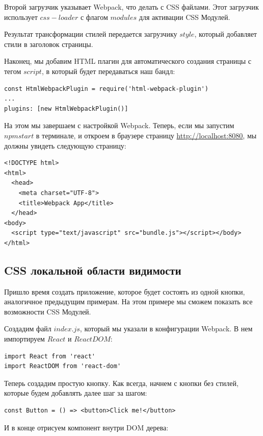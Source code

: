  Второй загрузчик указывает Webpack, что делать с CSS файлами. Этот загрузчик использует $css-loader$ с флагом $modules$ для активации CSS Модулей.
 
 Результат трансформации стилей передается загрузчику $style$, который добавляет стили в заголовок страницы.
 
 Наконец, мы добавим HTML плагин для автоматического создания страницы с тегом $script$, в который будет передаваться наш бандл:
 
\begin{lstlisting}
const HtmlWebpackPlugin = require('html-webpack-plugin')
...
plugins: [new HtmlWebpackPlugin()]
\end{lstlisting}

На этом мы завершаем с настройкой Webpack. Теперь, если мы запустим $npm start$ в терминале, и откроем в браузере страницу \url{http://localhost:8080}, мы должны увидеть следующую страницу:

\begin{lstlisting}
<!DOCTYPE html>
<html>
  <head>
    <meta charset="UTF-8">
    <title>Webpack App</title>
  </head>
<body>
  <script type="text/javascript" src="bundle.js"></script></body>
</html>
\end{lstlisting}
 
\subsection{CSS локальной области видимости}

Пришло время создать приложение, которое будет состоять из одной кнопки, аналогичное предыдущим примерам. На этом примере мы сможем показать все возможности CSS Модулей.

Создадим файл $index.js$, который мы указали в конфигурации Webpack. В нем импортируем $React$ и $ReactDOM$:

\begin{lstlisting}
import React from 'react'
import ReactDOM from 'react-dom'
\end{lstlisting}

Теперь создадим простую кнопку. Как всегда, начнем с кнопки без стилей, которые будем добавлять далее шаг за шагом:

\begin{lstlisting}
const Button = () => <button>Click me!</button>
\end{lstlisting}

И в конце отрисуем компонент внутри DOM дерева:

